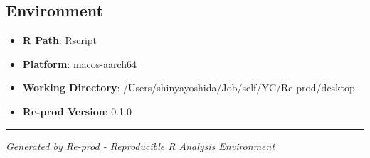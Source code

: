 \documentclass[
  11pt,
]{article}
\providecommand{\tightlist}{%
  \setlength{\itemsep}{0pt}\setlength{\parskip}{0pt}}
\begin{document}
\subsection{Environment}\label{environment}

\begin{itemize}
\tightlist
\item
  \textbf{R Path}: Rscript
\item
  \textbf{Platform}: macos-aarch64
\item
  \textbf{Working Directory}:
  /Users/shinyayoshida/Job/self/YC/Re-prod/desktop
\item
  \textbf{Re-prod Version}: 0.1.0
\end{itemize}

\begin{center}\rule{0.5\linewidth}{0.5pt}\end{center}

\emph{Generated by Re-prod - Reproducible R Analysis Environment}
\end{document}
